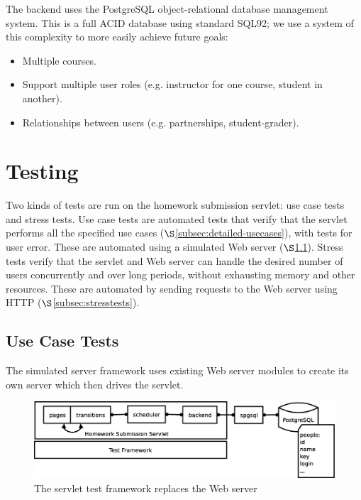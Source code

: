 \documentclass[a4paper]{article}
\begin{document}
The backend uses the PostgreSQL object-relational database management system.
This is a full ACID database using standard SQL92; we use a system of this
complexity to more easily achieve future goals:

\begin{itemize}
\item{Multiple courses.}
\item{Support multiple user roles (e.g. instructor for one course, student in
another).}
\item{Relationships between users (e.g. partnerships, student-grader).}
\end{itemize}

\section{Testing}\label{sec:tests}

Two kinds of tests are run on the homework submission servlet: use case tests
and stress tests. Use case tests are automated tests that verify that the
servlet performs all the specified use cases
($\S$\ref{subsec:detailed-usecases}), with tests for user error. These are
automated using a simulated Web server ($\S$\ref{subsec:use-case-tests}).
Stress tests verify that the servlet and Web server can handle the desired
number of users concurrently and over long periods, without exhausting memory
and other resources.  These are automated by sending requests to the Web server
using HTTP ($\S$\ref{subsec:stresstests}).

\subsection{Use Case Tests}\label{subsec:use-case-tests}

The simulated server framework uses existing Web server modules to create its
own server which then drives the servlet.

\begin{figure}[ht]
\centering
\includegraphics[scale=.30]{servlet-test.eps}
\caption{The servlet test framework replaces the Web server}
\label{fig:servlet-tests}
\end{figure}
\end{document}
